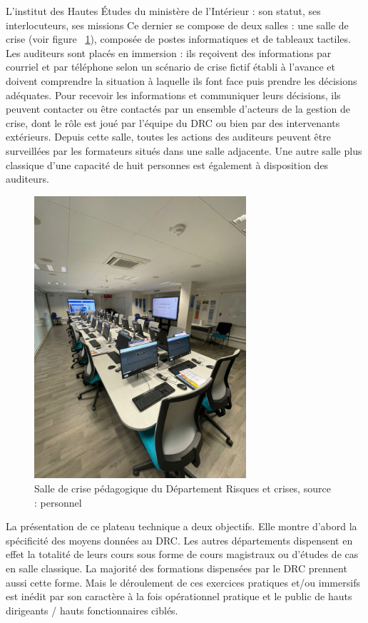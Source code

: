 \documentclass[10pt,a4paper]{report} %
\begin{document}
\begin{part}{L’institut des Hautes Études du ministère de l’Intérieur : son statut, ses interlocuteurs, ses missions}
Ce dernier se compose de deux salles : une salle de crise (voir figure ~\ref{fig3}), composée de postes informatiques et de tableaux tactiles. Les auditeurs sont placés en immersion : ils reçoivent des informations par courriel et par téléphone selon un scénario de crise fictif établi à l’avance et doivent comprendre la situation à laquelle ils font face puis prendre les décisions adéquates. Pour recevoir les informations et communiquer leurs décisions, ils peuvent contacter ou être contactés par un ensemble d’acteurs de la gestion de crise, dont le rôle est joué par l’équipe du DRC ou bien par des intervenants extérieurs. Depuis cette salle, toutes les actions des auditeurs peuvent être surveillées par les formateurs situés dans une salle adjacente. Une autre salle plus classique d’une capacité de huit personnes est également à disposition des auditeurs.
\begin{figure}[!t]
    \centering
    \includegraphics[width=0.7\textwidth]{figures/salledecrise.jpg}
    \caption{Salle de crise pédagogique du Département Risques et crises, source : personnel}
    \label{fig3}
\end{figure}

La présentation de ce plateau technique a deux objectifs. Elle montre d’abord la spécificité des moyens données au DRC. Les autres départements dispensent en effet la totalité de leurs cours sous forme de cours magistraux ou d’études de cas en salle classique. La majorité des formations dispensées par le DRC prennent aussi cette forme. Mais le déroulement de ces exercices pratiques et/ou immersifs est inédit par son caractère à la fois opérationnel pratique et le public de hauts dirigeants / hauts fonctionnaires ciblés. 


\end{part}
\end{document}
